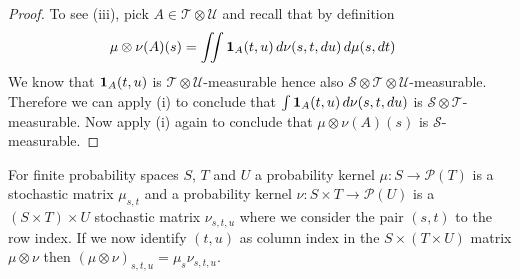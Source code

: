 \begin{proof}
To see (iii), pick $A \in \mathcal{T} \otimes \mathcal{U}$ and recall
that by definition
\begin{align*}
\mu \otimes \nu (A) (s) &= \iint \textbf{1}_{A}(t,u) \,
d\nu(s,t,du) \, d\mu(s, dt)
\end{align*}
We know that $\textbf{1}_{A}(t,u)$ is $\mathcal{T} \otimes
\mathcal{U}$-measurable hence also $\mathcal{S} \otimes \mathcal{T} \otimes
\mathcal{U}$-measurable.  Therefore we can apply (i) to conclude that $\int \textbf{1}_{A}(t,u) \,
d\nu(s,t,du)$ is $\mathcal{S} \otimes \mathcal{T}$-measurable.  Now
apply (i) again to conclude that $\mu \otimes \nu (A) (s)$ is $\mathcal{S}$-measurable.
\end{proof}

\begin{examp}
For finite probability spaces $S$, $T$ and $U$ a probability kernel
$\mu : S  \to \mathcal{P}(T)$ is a stochastic matrix $\mu_{s,t}$ and a
probability kernel $\nu : S \times T \to \mathcal{P}(U)$ is a $(S
\times T) \times U$
stochastic matrix $\nu_{s,t, u}$ where we consider the pair $(s,t)$ to
the row index.  If we now identify $(t,u)$ as column index in the 
$S \times (T \times U)$ matrix $\mu \otimes \nu$ then $(\mu \otimes
\nu)_{s,t,u} = \mu_s \nu_{s,t,u}$.
\end{examp}

